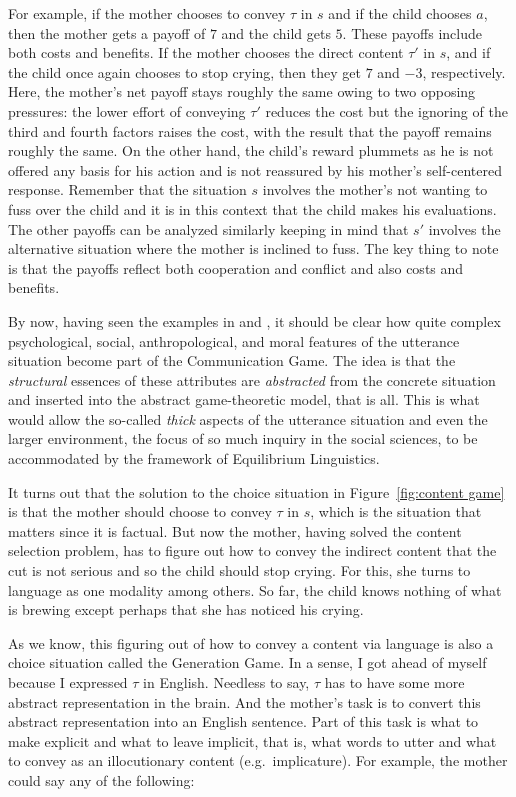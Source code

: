 For example, if the mother chooses to convey $\tau$ in $s$ and if the child chooses $a$, then the mother gets a payoff of $7$ and the child gets $5$. These payoffs include both costs and benefits. If the mother chooses the direct content $\tau'$ in $s$, and if the child once again chooses to stop crying, then they get $7$ and $-3$, respectively. Here, the mother's net payoff stays roughly the same owing to two opposing pressures: the lower effort of conveying $\tau'$ reduces the cost but the ignoring of the third and fourth factors raises the cost, with the result that the payoff remains roughly the same. On the other hand, the child's reward plummets as he is not offered any basis for his action and is not reassured by his mother's self-centered response. Remember that the situation $s$ involves the mother's not wanting to fuss over the child and it is in this context that the child makes his evaluations. The other payoffs can be analyzed similarly keeping in mind that $s'$ involves the alternative situation where the mother is inclined to fuss. The key thing to note is that the payoffs reflect both cooperation and conflict and also costs and benefits.

By now, having seen the examples in  and , it should be clear how quite complex psychological, social, anthropological, and moral features of the utterance situation become part of the Communication Game. The idea is that the \emph{structural} essences of these attributes are \emph{abstracted} from the concrete situation and inserted into the abstract game-theoretic model, that is all. This is what would allow the so-called \emph{thick} aspects of the utterance situation and even the larger environment, the focus of so much inquiry in the social sciences, to be accommodated by the framework of Equilibrium Linguistics.

It turns out that the solution to the choice situation in Figure~\ref{fig:content game} is that the mother should choose to convey $\tau$ in $s$, which is the situation that matters since it is factual. But now the mother, having solved the content selection problem, has to figure out how to convey the indirect content that the cut is not serious and so the child should stop crying. For this, she turns to language as one modality among others. So far, the child knows nothing of what is brewing except perhaps that she has noticed his crying.

As we know, this figuring out of how to convey a content via language is also a choice situation called the Generation Game. In a sense, I got ahead of myself because I expressed $\tau$ in English. Needless to say, $\tau$ has to have some more abstract representation in the brain. And the mother's task is to convert this abstract representation into an English sentence. Part of this task is what to make explicit and what to leave implicit, that is, what words to utter and what to convey as an illocutionary content (e.g.\ implicature). For example, the mother could say any of the following:

